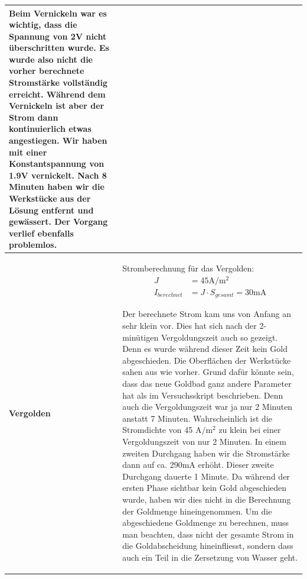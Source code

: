 \begin{longtable}{p{3cm}p{14cm}}
    Beim Vernickeln war es wichtig, dass die Spannung von 2V nicht überschritten wurde. Es wurde also nicht die vorher berechnete Stromstärke vollständig erreicht. Während dem Vernickeln ist aber der Strom dann kontinuierlich etwas angestiegen. Wir haben mit einer Konstantspannung von 1.9V vernickelt. Nach 8 Minuten haben wir die Werkstücke aus der Lösung entfernt und gewässert. Der Vorgang verlief ebenfalls problemlos.\\
    \hline
    
    \textbf{Vergolden}
    & Stromberechnung für das Vergolden:
    $$\begin{aligned}
        J &= 45 \mathrm{A/m^2}\\
        I_{berechnet} &= J \cdot S_{gesamt} = 30 \mathrm{mA}
    \end{aligned}$$
    
    Der berechnete Strom kam uns von Anfang an sehr klein vor. Dies hat sich nach der 2-minütigen Vergoldungszeit auch so gezeigt. Denn es wurde während dieser Zeit kein Gold abgeschieden. Die Oberflächen der Werkstücke sahen aus wie vorher. Grund dafür könnte sein, dass das neue Goldbad ganz andere Parameter hat als im Versuchsskript beschrieben. Denn auch die Vergoldungszeit war ja nur 2 Minuten anstatt 7 Minuten. Wahrscheinlich ist die Stromdichte von 45 $\mathrm{A/m^2}$ zu klein bei einer Vergoldungszeit von nur 2 Minuten.\newline
    In einem zweiten Durchgang haben wir die Stromstärke dann auf ca. 290mA erhöht. Dieser zweite Durchgang dauerte 1 Minute. Da während der ersten Phase sichtbar kein Gold abgeschieden wurde, haben wir dies nicht in die Berechnung der Goldmenge hineingenommen.\newline
    Um die abgeschiedene Goldmenge zu berechnen, muss man beachten, dass nicht der gesamte Strom in die Goldabscheidung hineinfliesst, sondern dass auch ein Teil in die Zersetzung von Wasser geht.
\end{longtable}
\newpage

